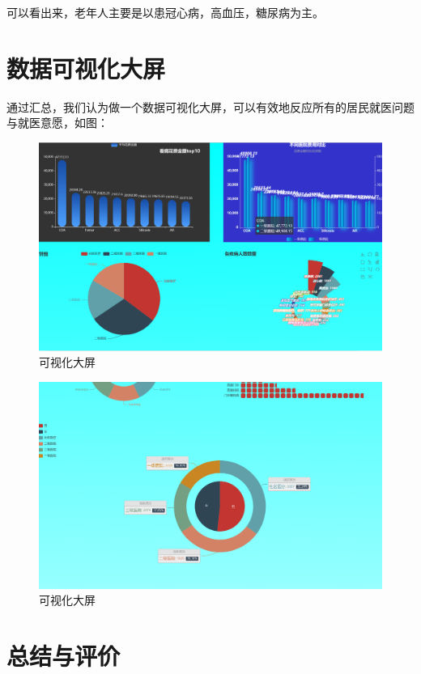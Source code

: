 \documentclass[12pt]{article}
\begin{document}
可以看出来，老年人主要是以患冠心病，高血压，糖尿病为主。

\section{数据可视化大屏}

通过汇总，我们认为做一个数据可视化大屏，可以有效地反应所有的居民就医问题与就医意愿，如图：

\begin{figure}[ht]
\centering
\includegraphics[scale=0.3]{figures/16.png}
\caption{可视化大屏}\label{fig:label2}
\end{figure}

\begin{figure}[ht]
\centering
\includegraphics[scale=0.3]{figures/15.png}
\caption{可视化大屏}\label{fig:label2}
\end{figure}
\section{总结与评价}
\end{document}
